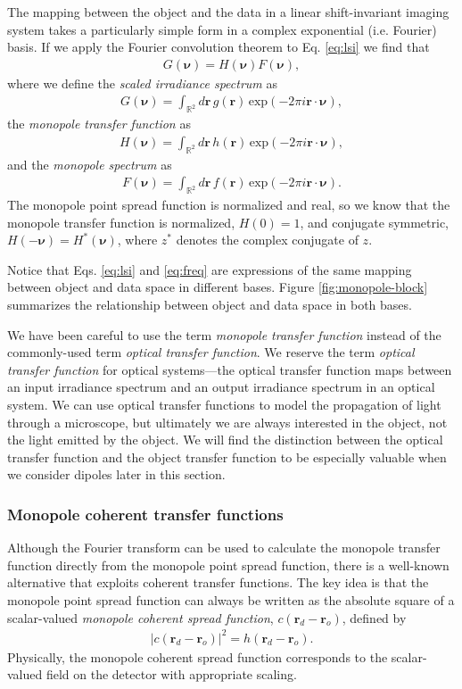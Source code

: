 \documentclass[]{osa-article}
\providecommand{\mb}[1]{\mathbf{#1}}
\providecommand{\ro}{\mathbf{\mathbf{r}}_o}
\providecommand{\rd}{\mathbf{r}_d}
\providecommand{\mbb}[1]{\mathbb{#1}}
\providecommand{\bs}[1]{\boldsymbol{#1}}
\providecommand{\bv}{\bs{\nu}}
\begin{document}
The mapping between the object and the data in a linear shift-invariant imaging
system takes a particularly simple form in a complex exponential (i.e. Fourier)
basis. If we apply the Fourier convolution theorem to Eq. \eqref{eq:lsi} we find
that
\begin{align}
  G(\bv) = H(\bv)F(\bv),\label{eq:freq}
\end{align}
where we define the \textit{scaled irradiance spectrum} as
\begin{align}
  G(\bv) = \int_{\mbb{R}^2}d\mb{r}\, g(\mb{r})\, \text{exp}(-2\pi i\mb{r}\cdot\bv),
\end{align}
the \textit{monopole transfer function} as
\begin{align}
  H(\bv) = \int_{\mbb{R}^2}d\mb{r}\, h(\mb{r})\, \text{exp}(-2\pi i\mb{r}\cdot\bv),\label{eq:otf}
\end{align}
and the \textit{monopole spectrum} as
\begin{align}
    F(\bv) = \int_{\mbb{R}^2}d\mb{r}\, f(\mb{r})\, \text{exp}(-2\pi i\mb{r}\cdot\bv).
\end{align}
The monopole point spread function is normalized and real, so we know that the
monopole transfer function is normalized, $H(0) = 1$, and conjugate symmetric,
$H(-\bv) = H^*(\bv)$, where $z^*$ denotes the complex conjugate of $z$.

Notice that Eqs. \eqref{eq:lsi} and \eqref{eq:freq} are expressions of the same
mapping between object and data space in different bases. Figure
\ref{fig:monopole-block} summarizes the relationship between object and data
space in both bases.

We have been careful to use the term \textit{monopole transfer function} instead
of the commonly-used term \textit{optical transfer function}. We reserve the
term \textit{optical transfer function} for optical systems---the optical
transfer function maps between an input irradiance spectrum and an output
irradiance spectrum in an optical system. We can use optical transfer functions
to model the propagation of light through a microscope, but ultimately we are
always interested in the object, not the light emitted by the object. We will
find the distinction between the optical transfer function and the object
transfer function to be especially valuable when we consider dipoles later in
this section.

\subsubsection{Monopole coherent transfer functions}
Although the Fourier transform can be used to calculate the monopole transfer
function directly from the monopole point spread function, there is a well-known
alternative that exploits coherent transfer functions. The key idea is that the
monopole point spread function can always be written as the absolute square of a
scalar-valued \textit{monopole coherent spread function}, $c(\rd - \ro)$,
defined by
\begin{align}
  |c(\rd - \ro)|^2 = h(\rd - \ro). \label{eq:absquarescalar}
\end{align}
Physically, the monopole coherent spread function corresponds to the
scalar-valued field on the detector with appropriate scaling.
\end{document}
